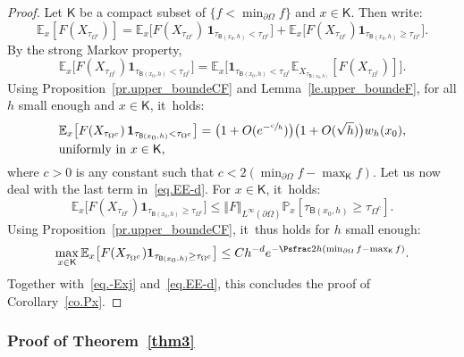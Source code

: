 \begin{proof}
Let $\mathsf K$ be a compact subset of $\{f<\min_{\partial \Omega}f\}$ and $x\in \mathsf K$. Then write:
\begin{equation}\label{eq.EE-d}
\mathbb E_{x} [F(X_{\tau_{\Omega^c}})]= \mathbb E_{x} \big [F(X_{\tau_{\Omega^c}})\, \mathbf{1}_{ \tau_{\mathsf B(x_0,h)}<\tau_{\Omega^c} }\big]+\mathbb E_{x} \big [F(X_{\tau_{\Omega^c}}) \mathbf{1}_{ \tau_{\mathsf B(x_0,h)}\ge \tau_{\Omega^c} }\big].
\end{equation}
By the strong Markov property,
\[
\mathbb E_{x} \big [F(X_{\tau_{\Omega^c}})\mathbf{1}_{ \tau_{\mathsf B(x_0,h)}<\tau_{\Omega^c} }\big]= \mathbb E_{x} \big [ \mathbf{1}_{ \tau_{\mathsf B(x_0,h)}<\tau_{\Omega^c} }\mathbb E_{X_{\tau_{\mathsf B(x_0,h)}}}[F(X_{\tau_{\Omega^c}})]\big].
\]
Using Proposition~\ref{pr.upper_boundeCF}
and Lemma~\ref{le.upper_boundeF}, for all $h$ small enough and $x\in \mathsf K$, it~holds:
\begin{equation}\label{eq.-Exj}
\begin{aligned}
& \mathbb E_{x} \big [F(X_{\tau_{\Omega^c}})\, \mathbf{1}_{
\tau_{\mathsf B (x_0,h)}<\tau_{\Omega^c} }\big]= \bigl(1+O(e^{-\sfrac
ch})\bigr)\bigl(1+O(\sqrt h)\bigr)w_h(x_0),\\
& \text{uniformly in $x\in \mathsf K$},
\end{aligned}
\end{equation}
where $c>0$ is any constant such that $c<2(\min_{\partial \Omega }f-\max_{\mathsf K} f)$. Let us now deal with the last term in~\eqref{eq.EE-d}.
For $x\in \mathsf K$, it~holds:
\[
\mathbb E_{x} \big [F(X_{\tau_{\Omega^c}}) \mathbf{1}_{ \tau_{\mathsf B(x_0,h)}\ge \tau_{\Omega^c} }\big]\le \Vert F\Vert _{L^\infty(\partial \Omega)} \mathbb P_{x} [\tau_{\mathsf B(x_0,h)}\ge \tau_{\Omega^c}].
\]
Using Proposition~\ref{pr.upper_boundeCF}, it~thus holds for $h$ small enough:\vspace*{-2pt}
\[
\max_{x\in \mathsf K}\mathbb E_{x} \big [F(X_{\tau_{\Omega^c}}) \mathbf{1}_{ \tau_{\mathsf B(x_0,h)}\ge \tau_{\Omega^c} }\big]\le Ch^{-d}e^{-\Psfrac 2h (\min_{\partial \Omega }f-\max_{\mathsf K} f)}.
\]
Together with~\eqref{eq.-Exj} and~\eqref{eq.EE-d}, this concludes the proof of Corollary~\ref{co.Px}.
\end{proof}

\subsubsection{Proof of Theorem~\ref{thm3}}

